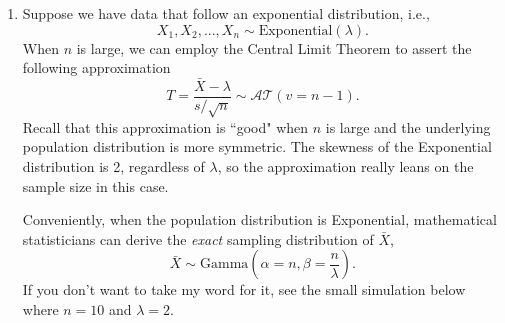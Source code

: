 \documentclass{article}\usepackage[]{graphicx}\usepackage[]{xcolor}
\begin{document}
\begin{enumerate}
\begin{enumerate}
\begin{enumerate}
      \textcolor{red}{The achieved $\alpha$ for this test is approximately 0.035.}
      
      
    \end{enumerate}
  \end{enumerate}
  \item Suppose we have data that follow an exponential distribution, i.e.,
  \[X_1, X_2, ..., X_n \sim \text{Exponential}(\lambda).\]
  When $n$ is large, we can employ the Central Limit Theorem to assert
  the following approximation
  \[T = \frac{\bar{X}-\lambda}{s/\sqrt{n}} \sim \mathcal{AT}(v=n-1).\]
  Recall that this approximation is ``good" when $n$ is large and the underlying 
  population distribution is more symmetric. The skewness of the Exponential 
  distribution is 2, regardless of $\lambda$, so the approximation really leans
  on the sample size in this case.
  
  Conveniently, when the population distribution is Exponential, mathematical 
  statisticians can derive the \emph{exact} sampling distribution of $\bar{X}$,
  \[\bar{X} \sim \textrm{Gamma}\left(\alpha=n, \beta=\frac{n}{\lambda}\right).\]
  If you don't want to take my word for it, see the small simulation below where 
  $n=10$ and $\lambda=2$.



\end{enumerate}
\end{document}
